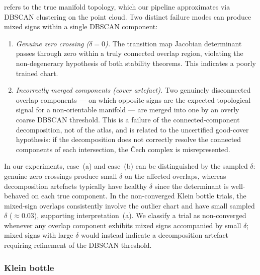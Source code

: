 \documentclass[11pt]{article}
\theoremstyle{plain}
\theoremstyle{definition}
\theoremstyle{remark}
\begin{document}
    refers to the true manifold topology, which our 
    pipeline approximates via DBSCAN clustering on the 
    point cloud.  Two distinct failure modes can produce 
    mixed signs within a single DBSCAN component:
    \begin{enumerate}[label=(\alph*)]
        \item \emph{Genuine zero crossing 
        ($\delta = 0$).}  The transition map Jacobian 
        determinant passes through zero within a truly 
        connected overlap region, violating the 
        non-degeneracy hypothesis of both stability 
        theorems.  This indicates a poorly trained chart.
        \item \emph{Incorrectly merged components 
        (cover artefact).}  Two genuinely disconnected 
        overlap components --- on which opposite signs are 
        the expected topological signal for a non-orientable 
        manifold --- are merged into one by an overly 
        coarse DBSCAN threshold.  This is a failure of the 
        connected-component decomposition, not of the 
        atlas, and is related to the uncertified good-cover 
        hypothesis: if the decomposition does not correctly 
        resolve the connected components of each 
        intersection, the \v{C}ech complex is 
        misrepresented.
    \end{enumerate}
    In our experiments, case~(a) and case~(b) can be 
    distinguished by the sampled $\delta$: genuine zero 
    crossings produce small $\delta$ on the affected 
    overlaps, whereas decomposition artefacts typically 
    have healthy $\delta$ since the determinant is 
    well-behaved on each true component.  In the 
    non-converged Klein bottle trials, the mixed-sign 
    overlaps consistently involve the outlier chart and 
    have small sampled $\delta$ ($\approx 0.03$), 
    supporting interpretation~(a).  We classify a trial 
    as non-converged whenever any overlap component 
    exhibits mixed signs accompanied by small $\delta$; 
    mixed signs with large $\delta$ would instead 
    indicate a decomposition artefact requiring 
    refinement of the DBSCAN threshold.

\subsubsection{Klein bottle}\label{sec:exp-klein}
\end{document}
